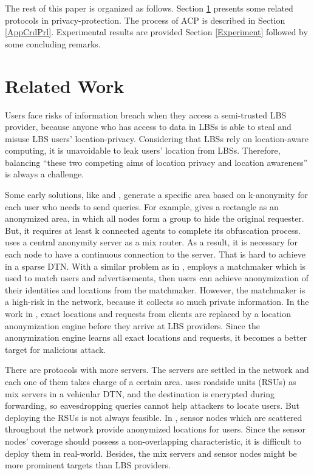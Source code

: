 \documentclass[conference]{IEEEtran}
\begin{document}
The rest of this paper is organized as follows. Section \ref{RelatedWork} presents some related protocols in privacy-protection. The process of ACP is described in Section \ref{AppCrdPrl}. Experimental results are provided Section \ref{Experiment} followed by some concluding remarks.

\section{Related Work} \label{RelatedWork}

Users face risks of information breach when they access a semi-trusted LBS provider, because anyone who has access to data in LBSs is able to steal and misuse LBS users’ location-privacy. Considering that  LBSs rely on location-aware computing, it is unavoidable to leak users' location from LBSs. Therefore, balancing “these two competing aims of location privacy and location awareness” \cite{C8} is always a challenge.

Some early solutions, like \cite{C9} and \cite{C3}, generate a specific area based on k-anonymity \cite{C10} for each user who needs to send queries. For example, \cite{C9} gives a rectangle as an anonymized area, in which all nodes form a group to hide the original requester. But, it requires at least k connected agents to complete its obfuscation process. \cite{C3} uses a central anonymity server as a mix router. As a result, it is necessary for each node to have a continuous connection to the server. That is hard to achieve in a sparse DTN. With a similar problem as in \cite{C3}, \cite{C11} employs a matchmaker which is used to match users and advertisements, then users can achieve anonymization of their identities and locations from the matchmaker. However, the matchmaker is a high-risk in the network, because it collects so much private information. In the work in \cite{C12}, exact locations and requests from clients are replaced by a location anonymization engine before they arrive at LBS providers. Since the anonymization engine learns all exact locations and requests, it becomes a better target for malicious attack.

There are protocols with more servers. The servers are settled in the network and each one of them takes charge of a certain area. \cite{C13} uses roadside units (RSUs) as mix servers in a vehicular DTN, and the destination is encrypted during forwarding, so eavesdropping queries cannot help attackers to locate users. But deploying the RSUs is not always feasible. In \cite{C21}, sensor nodes which are scattered throughout the network provide anonymized locations for users. Since the sensor nodes’ coverage should possess a non-overlapping characteristic, it is difficult to deploy them in real-world. Besides, the mix servers and sensor nodes might be more prominent targets than LBS providers.
\end{document}

